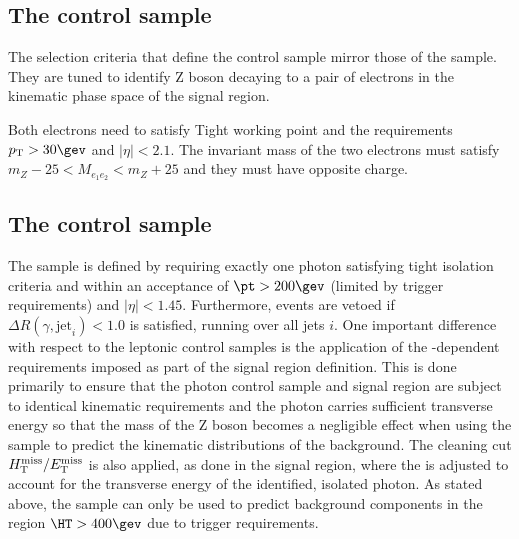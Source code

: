 \subsection{The \texorpdfstring{\eej}{electron plus jets} control sample}
\label{subsec:dielecontrolSelection}

The selection criteria that define the \eej control sample
mirror those of the \mmj sample. They are tuned
to identify Z boson decaying to a pair of electrons in the
kinematic phase space of the signal region.

Both electrons need to satisfy Tight working point and the
requirements $\Pt> 30\gev$ and $|\eta| < 2.1$. The invariant mass of
the two electrons must satisfy $m_{Z} - 25 < M_{e_1e_2} < m_{Z} + 25$
and they must have opposite charge.

\subsection{The \texorpdfstring{\gj}{photon plus jets} control sample}
\label{subsec:photoncontrolSelection}


The \gj sample is defined by requiring exactly one photon satisfying
tight isolation criteria and within an acceptance of $\pt > 200\gev$
(limited by trigger requirements) and $|\eta| < 1.45$. Furthermore,
events are vetoed if $\Delta R(\gamma,\textrm{jet}_i) < 1.0$ is
satisfied, running over all jets $i$. One important difference with
respect to the leptonic control samples is the application of the
\HT-dependent \alphat requirements imposed as part of the signal
region definition. This is done primarily to ensure that the photon
control sample and signal region are subject to identical kinematic
requirements and the photon carries sufficient transverse energy so
that the mass of the Z boson becomes a negligible effect when using
the \gj sample to predict the kinematic distributions of the \znunu
background. The cleaning cut $\mbox{$H_{\rm T}^{\rm miss}$}/\mbox{$E_\text{T}^{\rm miss}$}$ is also applied, as done in
the signal region, where the \met is adjusted to account for the
transverse energy of the identified, isolated photon. As stated above,
the \gj sample can only be used to predict background components in
the region $\HT > 400\gev$ due to trigger requirements.
